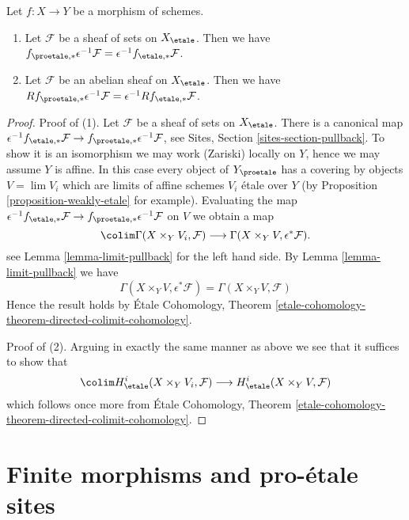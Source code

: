 \begin{lemma}
\label{lemma-morphism-comparison}
Let $f : X \to Y$ be a morphism of schemes.
\begin{enumerate}
\item Let $\mathcal{F}$ be a sheaf of sets on $X_\etale$. Then we have
$f_{\proetale, *}\epsilon^{-1}\mathcal{F} =
\epsilon^{-1}f_{\etale, *}\mathcal{F}$.
\item Let $\mathcal{F}$ be an abelian sheaf on $X_\etale$. Then we have
$Rf_{\proetale, *}\epsilon^{-1}\mathcal{F} =
\epsilon^{-1}Rf_{\etale, *}\mathcal{F}$.
\end{enumerate}
\end{lemma}

\begin{proof}
Proof of (1). Let $\mathcal{F}$ be a sheaf of sets on $X_\etale$. There
is a canonical map $\epsilon^{-1}f_{\etale, *}\mathcal{F} \to
f_{\proetale, *}\epsilon^{-1}\mathcal{F}$, see
Sites, Section \ref{sites-section-pullback}.
To show it is an isomorphism we may work (Zariski) locally on $Y$, hence
we may assume $Y$ is affine. In this case
every object of $Y_\proetale$ has a covering by objects $V = \lim V_i$
which are limits of affine schemes $V_i$ \'etale over $Y$ (by
Proposition \ref{proposition-weakly-etale}
for example). Evaluating the map
$\epsilon^{-1}f_{\etale, *}\mathcal{F} \to
f_{\proetale, *}\epsilon^{-1}\mathcal{F}$
on $V$ we obtain a map
$$
\colim \Gamma(X \times_Y V_i, \mathcal{F})
\longrightarrow
\Gamma(X \times_Y V, \epsilon^*\mathcal{F}).
$$
see Lemma \ref{lemma-limit-pullback} for the left hand side.
By Lemma \ref{lemma-limit-pullback} we have
$$
\Gamma(X \times_Y V, \epsilon^*\mathcal{F}) =
\Gamma(X \times_Y V, \mathcal{F})
$$
Hence the result holds by
\'Etale Cohomology, Theorem
\ref{etale-cohomology-theorem-directed-colimit-cohomology}.

\medskip\noindent
Proof of (2). Arguing in exactly the same manner as above
we see that it suffices to show that
$$
\colim H^i_\etale(X \times_Y V_i, \mathcal{F})
\longrightarrow
H^i_\etale(X \times_Y V, \mathcal{F})
$$
which follows once more from \'Etale Cohomology, Theorem
\ref{etale-cohomology-theorem-directed-colimit-cohomology}.
\end{proof}







\section{Finite morphisms and pro-\'etale sites}
\label{section-finite}

